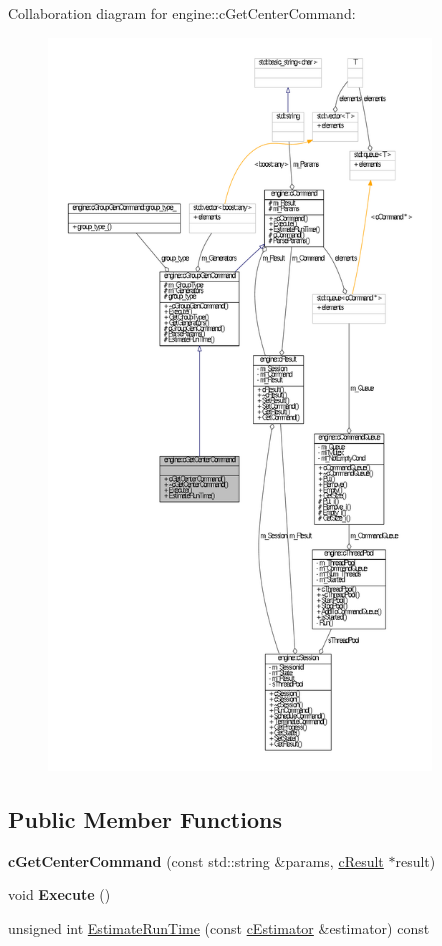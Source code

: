 \-Collaboration diagram for engine\-:\-:c\-Get\-Center\-Command\-:
\nopagebreak
\begin{figure}[H]
\begin{center}
\leavevmode
\includegraphics[height=550pt]{classengine_1_1cGetCenterCommand__coll__graph}
\end{center}
\end{figure}
\subsection*{\-Public \-Member \-Functions}
\begin{DoxyCompactItemize}
\item 
\hypertarget{classengine_1_1cGetCenterCommand_ae215414c205174cc048d63174f19fd3a}{{\bfseries c\-Get\-Center\-Command} (const std\-::string \&params, \hyperlink{classengine_1_1cResult}{c\-Result} $\ast$result)}\label{classengine_1_1cGetCenterCommand_ae215414c205174cc048d63174f19fd3a}

\item 
\hypertarget{classengine_1_1cGetCenterCommand_a7d2754e5ade6a96e6043547a7f2b1a03}{void {\bfseries \-Execute} ()}\label{classengine_1_1cGetCenterCommand_a7d2754e5ade6a96e6043547a7f2b1a03}

\item 
unsigned int \hyperlink{classengine_1_1cGetCenterCommand_ab00fa221228c2550e8f664c6d887e1e0}{\-Estimate\-Run\-Time} (const \hyperlink{classengine_1_1cEstimator}{c\-Estimator} \&estimator) const 
\end{DoxyCompactItemize}


